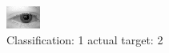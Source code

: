 \begin{figure}[h!]
\begin{center}
\includegraphics[width=0.60\columnwidth]{figures/ID477_class_1_target_2.png}
\end{center}
\caption{ Classification: 1 actual target: 2}
\label{fig:ID477_class_1_target_2}
\end{figure}
